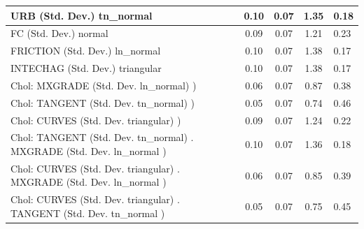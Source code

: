 \begin{table}
\begin{center}
\begin{tabular}{|l|l|c|c|c|l|}
			\hline
			URB (Std. Dev.) tn_normal &  & 0.10 & 0.07 & 1.35 & 0.18 \\
			\hline
			FC (Std. Dev.) normal &  & 0.09 & 0.07 & 1.21 & 0.23 \\
			\hline
			FRICTION (Std. Dev.) ln_normal &  & 0.10 & 0.07 & 1.38 & 0.17 \\
			\hline
			INTECHAG (Std. Dev.) triangular &  & 0.10 & 0.07 & 1.38 & 0.17 \\
			\hline
			 Chol: MXGRADE (Std. Dev. ln_normal) ) &  & 0.06 & 0.07 & 0.87 & 0.38 \\
			\hline
			 Chol: TANGENT (Std. Dev. tn_normal) ) &  & 0.05 & 0.07 & 0.74 & 0.46 \\
			\hline
			 Chol: CURVES (Std. Dev. triangular) ) &  & 0.09 & 0.07 & 1.24 & 0.22 \\
			\hline
			 Chol: TANGENT (Std. Dev. tn_normal) . MXGRADE (Std. Dev.   ln_normal ) &  & 0.10 & 0.07 & 1.36 & 0.18 \\
			\hline
			 Chol: CURVES (Std. Dev. triangular) . MXGRADE (Std. Dev.   ln_normal ) &  & 0.06 & 0.07 & 0.85 & 0.39 \\
			\hline
			 Chol: CURVES (Std. Dev. triangular) . TANGENT (Std. Dev.   tn_normal ) &  & 0.05 & 0.07 & 0.75 & 0.45 \\
			\hline
		\end{tabular}
	\end{center}
\end{table}